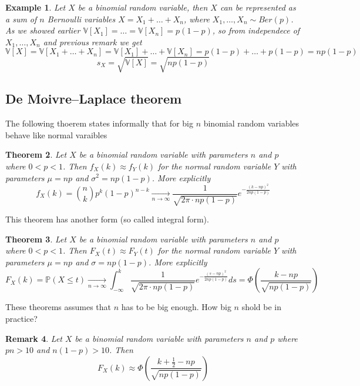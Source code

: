 \documentclass[12pt]{article}
\newtheorem{theorem}{Theorem}[subsection]
\newtheorem{remark}[theorem]{Remark}
\newtheorem{example}[theorem]{Example}
\begin{document}
\begin{example} Let $X$ be a binomial random variable, then $X$ can be
    represented as a sum of $n$ Bernoulli variables
    $X=X_1+\ldots+X_n$,  %
    where $X_1,\ldots,X_n\sim Ber(p)$. As we showed earlier
    $\mathbb{V}[X_1]=\ldots=\mathbb{V}[X_n]=p(1-p)$,   %
    so from independece of
    $X_1,\ldots, X_n$ and previous remark we get
    $$
        \mathbb{V}[X]
        =\mathbb{V}[X_1+\ldots+X_n]    %
        =\mathbb{V}[X_1]+\ldots+\mathbb{V}[X_n]    %
        =p(1-p)+\ldots+p(1-p)=np(1-p)    %
    $$
    $$
        s_X=\sqrt{\mathbb{V}[X]}=\sqrt{np(1-p)}
    $$
\end{example}

\subsection{De Moivre–Laplace theorem}

The following thoerem states informally that for big $n$ binomial random
variables behave like normal varaibles

\begin{theorem} Let $X$ be a binomial random variable with parameters $n$ and
    $p$ where $0<p<1$. Then $f_X(k)\approx f_Y(k)$ for the normal random
    variable $Y$ with parameters $\mu=np$ and $\sigma^2=np(1-p)$. More
    explicitly
    $$
        f_X(k)
        =\binom{n}{k}p^k {(1-p)}^{n-k}
        \underset{n\to\infty}{\to}
        \frac{1}{\sqrt{2\pi \cdot np(1-p)}}e^{-\frac{{(k-np)}^2}{2np(1-p)}}
    $$
\end{theorem}

This theorem has another form (so called integral form).

\begin{theorem} Let $X$ be a binomial random variable with parameters $n$ and
    $p$ where $0<p<1$. Then $F_X(t)\approx F_Y(t)$ for the normal random
    variable $Y$ with parameters $\mu=np$ and $\sigma=np(1-p)$. More explicitly
    $$
        F_X(k)
        =\mathbb{P}(X\leq t)
        \underset{n\to\infty}{\to}
        \int_{-\infty}^k
        \frac{1}{\sqrt{2\pi \cdot np(1-p)}}
        e^{-\frac{{(s-np)}^2}{2np(1-p)}}ds
        =\Phi\left(\frac{k-np}{\sqrt{np(1-p)}}\right)
    $$
\end{theorem}

These theorems assumes that $n$ has to be big enough. How big $n$ shold be in
practice?

\begin{remark} Let $X$ be a binomial random variable with parameters $n$ and $p$
    where $pn>10$ and $n(1-p)>10$.  Then
    $$
        F_X(k)\approx\Phi\left(\frac{k+\frac{1}{2}-np}{\sqrt{np(1-p)}}\right)
    $$
\end{remark}
\end{document}
